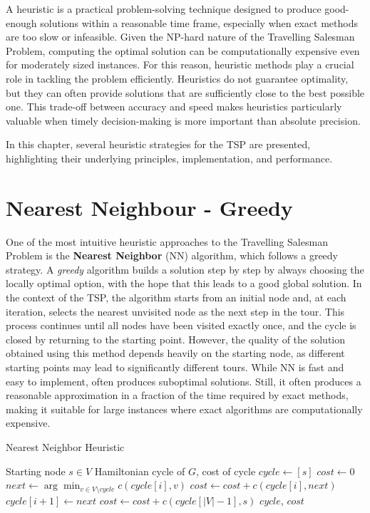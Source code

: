 A heuristic is a practical problem-solving technique designed to produce good-enough solutions within a reasonable time frame, 
especially when exact methods are too slow or infeasible. Given the NP-hard nature of the Travelling Salesman Problem, 
computing the optimal solution can be computationally expensive even for moderately sized instances. For this reason, heuristic methods 
play a crucial role in tackling the problem efficiently. Heuristics do not guarantee optimality, but they can often provide solutions 
that are sufficiently close to the best possible one. This trade-off between accuracy and speed makes heuristics particularly valuable 
when timely decision-making is more important than absolute precision.

In this chapter, several heuristic strategies for the TSP are presented, highlighting their underlying principles, implementation, and performance.

\section{Nearest Neighbour - Greedy}

One of the most intuitive heuristic approaches to the Travelling Salesman Problem is the \textbf{Nearest Neighbor} (NN) algorithm, which follows a greedy strategy. 
A \textit{greedy} algorithm builds a solution step by step by always choosing the locally optimal option, with the hope that this leads to a good global solution.
In the context of the TSP, the algorithm starts from an initial node and, at each iteration, selects the nearest unvisited node as the next step in the tour. 
This process continues until all nodes have been visited exactly once, and the cycle is closed by returning to the starting point.
However, the quality of the solution obtained using this method depends heavily on the starting node, as different starting points may lead to significantly 
different tours.
While NN is fast and easy to implement, often produces suboptimal solutions. Still, it often produces a reasonable approximation in a fraction of the time required by exact methods, making it suitable for large instances where exact algorithms are computationally expensive.

\begin{algorithm}
\caption{Nearest Neighbor Heuristic}
\begin{algorithmic}
  \Require Starting node $s \in V$
  \Ensure Hamiltonian cycle of $G$, cost of cycle
  \State $cycle \gets [s]$
  \State $cost \gets 0$
    \State $next \gets \arg\min_{v \in V \setminus cycle} c(cycle[i], v)$
    \State $cost \gets cost + c(cycle[i], next)$
    \State $cycle[i+1] \gets next$
  \EndFor
  \State $cost \gets cost + c(cycle[|V| - 1], s)$
  \State \Return $cycle$, $cost$
\end{algorithmic}
\end{algorithm}

